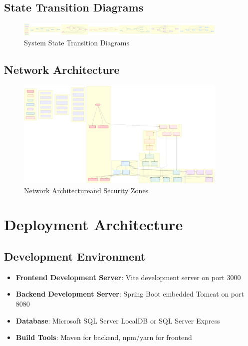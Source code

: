 \documentclass[12pt,a4paper]{article}
\begin{document}
\subsection{State Transition Diagrams}

\begin{figure}[H]
\centering
\includegraphics[width=0.9\textwidth]{diagrams/state_transition_diagram.svg}
\caption{System State Transition Diagrams}
\label{fig:state-transition-diagram}
\end{figure}

\subsection{Network Architecture}

\begin{figure}[H]
\centering
\includegraphics[width=0.9\textwidth]{diagrams/network_architecture.svg}
\caption{Network Architectureand Security Zones}
\label{fig:component-diagram}
\end{figure}

\section{Deployment Architecture}

\subsection{Development Environment}

\begin{itemize}
\item \textbf{Frontend Development Server}: Vite development server on port 3000
\item \textbf{Backend Development Server}: Spring Boot embedded Tomcat on port 8080
\item \textbf{Database}: Microsoft SQL Server LocalDB or SQL Server Express
\item \textbf{Build Tools}: Maven for backend, npm/yarn for frontend
\end{itemize}
\end{document}
